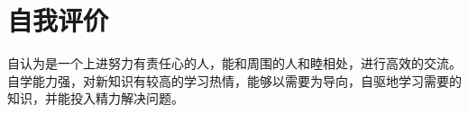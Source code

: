 \documentclass{resume}
\begin{document}
\section{自我评价}
\qquad 自认为是一个上进努力有责任心的人，能和周围的人和睦相处，进行高效的交流。自学能力强，对新知识有较高的学习热情，能够以需要为导向，自驱地学习需要的知识，并能投入精力解决问题。


%  
\end{document}
